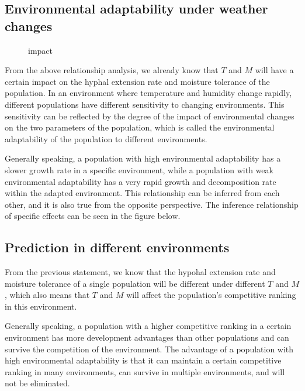 \documentclass{mcmthesis}
\begin{document}
\subsection{Environmental adaptability under weather changes}
\begin{figure}[h]
	\caption{impact}
\end{figure}
From the above relationship analysis, we already know that $T$ and $M$ will have a certain impact on the hyphal extension rate and moisture tolerance of the population. In an environment where temperature and humidity change rapidly, different populations have different sensitivity to changing environments. This sensitivity can be reflected by the degree of the impact of environmental changes on the two parameters of the population, which is called the environmental adaptability of the population to different environments. 

Generally speaking, a population with high environmental adaptability has a slower growth rate in a specific environment, while a population with weak environmental adaptability has a very rapid growth and decomposition rate within the adapted environment. This relationship can be inferred from each other, and it is also true from the opposite perspective. The inference relationship of specific effects can be seen in the figure below.

\subsection{Prediction in different environments}
From the previous statement, we know that the hypohal extension rate and moisture tolerance of a single population will be different under different $T$ and $M$, which also means that $T$ and $M$ will affect the population's competitive ranking in this environment. 

Generally speaking, a population with a higher competitive ranking in a certain environment has more development advantages than other populations and can survive the competition of the environment. The advantage of a population with high environmental adaptability is that it can maintain a certain competitive ranking in many environments, can survive in multiple environments, and will not be eliminated. 
\end{document}

